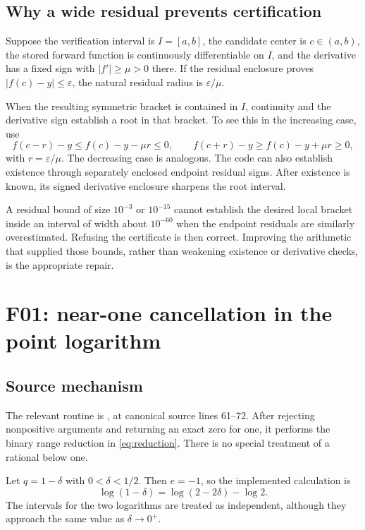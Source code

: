 \documentclass[11pt,letterpaper]{article}
\newcommand{\code}[1]{\texttt{\detokenize{#1}}}
\theoremstyle{remark}\newtheorem{remark}[proposition]{Remark}
\begin{document}
\subsection{Why a wide residual prevents certification}
Suppose the verification interval is $I=[a,b]$, the candidate center is
$c\in(a,b)$, the stored forward function is continuously differentiable on
$I$, and the derivative has a fixed sign with $|f'|\ge\mu>0$ there. If the
residual enclosure proves $|f(c)-y|\le\varepsilon$, the natural residual
radius is $\varepsilon/\mu$.

When the resulting symmetric bracket is contained in $I$, continuity and
the derivative sign establish a root in that bracket. To see this in the
increasing case, use
\[
 f(c-r)-y\le f(c)-y-\mu r\le0,\qquad
 f(c+r)-y\ge f(c)-y+\mu r\ge0,
\]
with $r=\varepsilon/\mu$. The decreasing case is analogous. The code can
also establish existence through separately enclosed endpoint residual
signs. After existence is known, its signed derivative enclosure sharpens
the root interval.\cite{certsource}

A residual bound of size $10^{-3}$ or $10^{-15}$ cannot establish the desired
local bracket inside an interval of width about $10^{-60}$ when the
endpoint residuals are similarly overestimated. Refusing the certificate is
then correct. Improving the arithmetic that supplied those bounds, rather
than weakening existence or derivative checks, is the appropriate repair.

\section{F01: near-one cancellation in the point logarithm}
\subsection{Source mechanism}
The relevant routine is \code{certLogPoint}, at canonical source lines
61--72. After rejecting nonpositive arguments and returning an exact zero
for one, it performs the binary range reduction in
\eqref{eq:reduction}. There is no special treatment of a rational below
one.\cite{certsource}

Let $q=1-\delta$ with $0<\delta<1/2$. Then $e=-1$, so the implemented
calculation is
\begin{equation}\label{eq:badreduce}
 \log(1-\delta)=\log(2-2\delta)-\log2.
\end{equation}
The intervals for the two logarithms are treated as independent, although
they approach the same value as $\delta\to0^+$.
\end{document}
